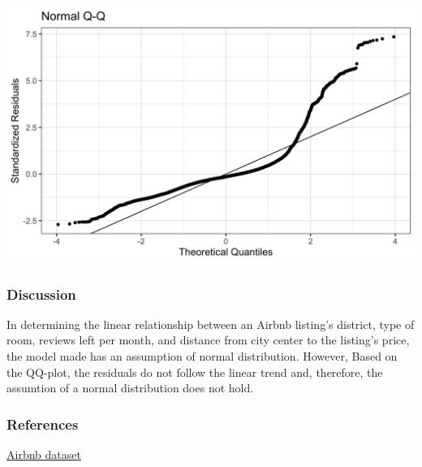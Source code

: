 \documentclass[]{article}
\begin{document}
\includegraphics[width=7.03125in,height=\textheight]{../images/QQ_plot.png}

\hypertarget{discussion}{%
\subsubsection{Discussion}\label{discussion}}

In determining the linear relationship between an Airbnb listing's
district, type of room, reviews left per month, and distance from city
center to the listing's price, the model made has an assumption of
normal distribution. However, Based on the QQ-plot, the residuals do not
follow the linear trend and, therefore, the assumtion of a normal
distribution does not hold.

\hypertarget{references}{%
\subsubsection{References}\label{references}}

\href{http://insideairbnb.com/get-the-data.html}{Airbnb dataset}
\end{document}
